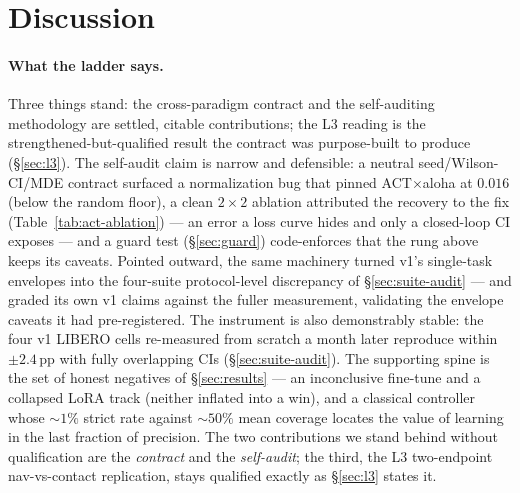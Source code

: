 \documentclass[10pt]{article}
\begin{document}

\section{Discussion}

\paragraph{What the ladder says.}
Three things stand: the cross-paradigm contract and the self-auditing
methodology are settled, citable contributions; the L3 reading is the
strengthened-but-qualified result the contract was purpose-built to
produce (\S\ref{sec:l3}). The self-audit claim is narrow and defensible: a
neutral seed/Wilson-CI/MDE contract surfaced a normalization bug that
pinned ACT$\times$aloha at $0.016$ (below the random floor), a clean
$2{\times}2$ ablation attributed the recovery to the
fix (Table~\ref{tab:act-ablation}) --- an error a loss curve hides and only
a closed-loop CI exposes --- and a guard test (\S\ref{sec:guard})
code-enforces that the rung above keeps its caveats. Pointed outward, the
same machinery turned v1's single-task envelopes into the four-suite
protocol-level discrepancy of \S\ref{sec:suite-audit} --- and graded its
own v1 claims against the fuller measurement, validating the envelope
caveats it had pre-registered. The instrument is also demonstrably
stable: the four v1 LIBERO cells re-measured from scratch a month later
reproduce within $\pm2.4$\,pp with fully overlapping CIs
(\S\ref{sec:suite-audit}). The supporting spine
is the set of honest negatives of \S\ref{sec:results} --- an inconclusive
fine-tune and a collapsed LoRA track (neither inflated into a win), and a
classical controller whose ${\sim}1\%$ strict rate against
${\sim}50\%$ mean coverage locates the value of learning in the last
fraction of precision.
The two contributions we stand behind without qualification are
the \emph{contract} and the \emph{self-audit}; the third, the L3
two-endpoint nav-vs-contact replication, stays qualified exactly as
\S\ref{sec:l3} states it.
\end{document}
